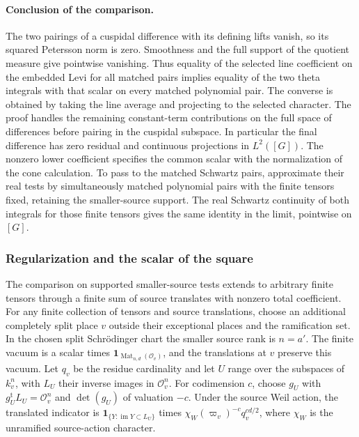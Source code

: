 \paragraph{Conclusion of the comparison.}
The two pairings of a cuspidal difference with its defining lifts
vanish, so its squared Petersson norm is zero. Smoothness and the
full support of the quotient measure give pointwise vanishing.
Thus equality of the selected line coefficient on the embedded
Levi for all matched pairs implies equality of the two theta
integrals with that scalar on every matched polynomial pair. The
converse is obtained by taking the line average and projecting to
the selected character. The proof handles the remaining
constant-term contributions on the full space of differences
before pairing in the cuspidal subspace. In particular the final
difference has zero residual and continuous projections in
\(L^2([G])\). The nonzero lower coefficient specifies the common scalar with the
normalization of the cone calculation. To pass to the matched
Schwartz pairs, approximate their real tests by simultaneously
matched polynomial pairs with the finite tensors fixed, retaining
the smaller-source support. The real Schwartz continuity of both
integrals for those finite tensors gives the same identity in the
limit, pointwise on \([G]\).

\subsubsection{Regularization and the scalar of the square}
\label{sec:period-square-regularization}
The comparison on supported smaller-source tests extends to
arbitrary finite tensors through a finite sum of source
translates with nonzero total coefficient. For any finite
collection of tensors and source translations, choose an
additional completely split place \(v\) outside their
exceptional places and the ramification set. In the chosen
split Schr\"odinger chart the smaller source rank is \(n=a'\).
The finite vacuum is a scalar times
\(\mathbf1_{\operatorname{Mat}_{n,d}(\mathcal O_v)}\), and the
translations at \(v\) preserve this vacuum. Let \(q_v\) be the
residue cardinality and let \(U\) range over the subspaces of
\(k_v^n\), with \(L_U\) their inverse images in
\(\mathcal O_v^n\). For codimension \(c\), choose \(g_U\) with
\(g_U^{\mathrm t}L_U=\mathcal O_v^n\) and
\(\det(g_U)\) of valuation \(-c\). Under the source Weil
action, the translated indicator is
\(\mathbf1_{\{Y:\operatorname{im}Y\subset L_U\}}\) times
\(\chi_W(\varpi_v)^{-c}q_v^{cd/2}\), where \(\chi_W\)
is the unramified source-action character.

